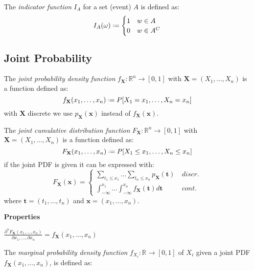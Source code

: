 \documentclass[8pt,a4paper]{extarticle}     %
\newcommand{\R}{\mathbb{R}}
\newcommand{\colfill}{\vfill\eject\columnbreak}
\newcommand{\eqdef}{\mathrel{\vcenter{\baselineskip0.5ex\lineskiplimit0pt\hbox{\scriptsize.}\hbox{\scriptsize.}}}=}
\renewcommand{\vec}[1]{\mathbf{#1}}
\begin{document}
\begin{multicols}{4}
\begin{boxdefinition} 
	The \textit{indicator function} $I_A$ for a set (event) $A$ is defined as: 
	\[
		I_A(\omega) \eqdef 
		\begin{cases}
			1 & w\in A \\ 
			0 & w\in A^C
		\end{cases}
	\]
\end{boxdefinition}

\colfill

\subsection{Joint Probability}
\begin{boxdefinition} 
	The \textit{joint probability density function} $f_{\vec{X}}:\R^n\rightarrow[0,1]$ with $\vec{X} = (X_1,\dots,X_n)$ is a function defined as: 
	\[
		f_{\vec{X}}(x_1,\dots,x_n) \eqdef P[X_1 = x_1,\dots,X_n = x_n]
	\]
	with $\vec{X}$ discrete we use $p_{\vec{X}}(\vec{x})$ instead of $f_{\vec{X}}(\vec{x})$.
\end{boxdefinition}
\begin{boxdefinition} 
	The \textit{joint cumulative distribution function} $F_{\vec{X}}:\R^n\rightarrow[0,1]$ with $\vec{X} = (X_1,\dots,X_n)$ is a function defined as: 
	\[
		F_{\vec{X}}(x_1,\dots,x_n) \eqdef P[X_1\leq x_1,\dots,X_n \leq x_n]
	\]
	if the joint PDF is given it can be expressed with:
	\[
		F_{\vec{X}}(\vec{x}) =
		\begin{cases}
			\displaystyle \sum_{t_1\leq x_1}\dots\sum_{t_n\leq x_n} p_{\vec{X}}(\vec{t})  & \ \textit{discr.}\\[2em]
			\displaystyle \int_{-\infty}^{x_1}\dots\int_{-\infty}^{x_n} f_{\vec{X}}(\vec{t})d\vec{t} & \ \textit{cont.}
		\end{cases}
	\]
	where $\vec{t}=(t_1,\dots,t_n)$ and $\vec{x}=(x_1,\dots,x_n)$.
\end{boxdefinition}
\begin{listb}
	\item [] \textbf{Properties}
	\item $\displaystyle\frac{\partial^n F_\vec{X}(x_1,\dots,x_n)}{\partial x_1,\dots,\partial x_n} = f_{\vec{X}}(x_1,\dots,x_n)$
\end{listb}
\begin{boxdefinition} 
	The \textit{marginal probability density function} $f_{X_i}:\R\rightarrow[0,1]$ of $X_i$ given a joint PDF $f_{\vec{X}}(x_1,\dots,x_n)$, is defined as:

\end{boxdefinition}
\end{multicols}
\end{document}
